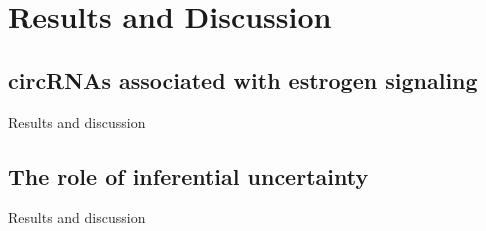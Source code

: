 \chapter{Results and Discussion}

\section{circRNAs associated with estrogen signaling}
Results and discussion

\lipsum[1-2]

\section{The role of inferential uncertainty}
Results and discussion

\lipsum[1-2]
